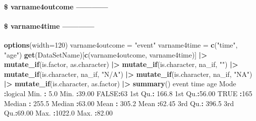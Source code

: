 \documentclass[
]{article}
\newenvironment{Shaded}{\begin{snugshade}}{\end{snugshade}}
\newcommand{\AttributeTok}[1]{\textcolor[rgb]{0.13,0.29,0.53}{#1}}
\newcommand{\ConstantTok}[1]{\textcolor[rgb]{0.56,0.35,0.01}{#1}}
\newcommand{\DecValTok}[1]{\textcolor[rgb]{0.00,0.00,0.81}{#1}}
\newcommand{\FloatTok}[1]{\textcolor[rgb]{0.00,0.00,0.81}{#1}}
\newcommand{\FunctionTok}[1]{\textcolor[rgb]{0.13,0.29,0.53}{\textbf{#1}}}
\newcommand{\NormalTok}[1]{#1}
\newcommand{\OtherTok}[1]{\textcolor[rgb]{0.56,0.35,0.01}{#1}}
\newcommand{\SpecialCharTok}[1]{\textcolor[rgb]{0.81,0.36,0.00}{\textbf{#1}}}
\newcommand{\StringTok}[1]{\textcolor[rgb]{0.31,0.60,0.02}{#1}}
\begin{document}
\hypertarget{varname4outcome}{%
\paragraph{\$ varname4outcome ------------}\label{varname4outcome}}

\hypertarget{varname4time}{%
\paragraph{\$ varname4time ------------}\label{varname4time}}

\begin{Shaded}
\begin{Highlighting}[]
\FunctionTok{options}\NormalTok{(}\AttributeTok{width=}\DecValTok{120}\NormalTok{)}
\NormalTok{varname4outcome }\OtherTok{=} \StringTok{"event"}
\NormalTok{varname4time }\OtherTok{=} \FunctionTok{c}\NormalTok{(}\StringTok{"time"}\NormalTok{, }\StringTok{"age"}\NormalTok{)}
\FunctionTok{get}\NormalTok{(DataSetName)[}\FunctionTok{c}\NormalTok{(varname4outcome, varname4time)] }\SpecialCharTok{|\textgreater{}} 
    \FunctionTok{mutate\_if}\NormalTok{(is.factor, as.character) }\SpecialCharTok{|\textgreater{}}  
    \FunctionTok{mutate\_if}\NormalTok{(is.character, na\_if, }\StringTok{""}\NormalTok{) }\SpecialCharTok{|\textgreater{}} \FunctionTok{mutate\_if}\NormalTok{(is.character, na\_if, }\StringTok{"N/A"}\NormalTok{) }\SpecialCharTok{|\textgreater{}} \FunctionTok{mutate\_if}\NormalTok{(is.character, na\_if, }\StringTok{"NA"}\NormalTok{) }\SpecialCharTok{|\textgreater{}} 
    \FunctionTok{mutate\_if}\NormalTok{(is.character, as.factor) }\SpecialCharTok{|\textgreater{}} 
    \FunctionTok{summary}\NormalTok{()}
\NormalTok{   event              time             age       }
\NormalTok{ Mode }\SpecialCharTok{:}\NormalTok{logical   Min.   }\SpecialCharTok{:}   \FloatTok{5.0}\NormalTok{   Min.   }\SpecialCharTok{:}\FloatTok{39.00}  
 \ConstantTok{FALSE}\SpecialCharTok{:}\DecValTok{63}\NormalTok{        1st Qu.}\SpecialCharTok{:} \FloatTok{166.8}\NormalTok{   1st Qu.}\SpecialCharTok{:}\FloatTok{56.00}  
 \ConstantTok{TRUE} \SpecialCharTok{:}\DecValTok{165}\NormalTok{       Median }\SpecialCharTok{:} \FloatTok{255.5}\NormalTok{   Median }\SpecialCharTok{:}\FloatTok{63.00}  
\NormalTok{                 Mean   }\SpecialCharTok{:} \FloatTok{305.2}\NormalTok{   Mean   }\SpecialCharTok{:}\FloatTok{62.45}  
\NormalTok{                 3rd Qu.}\SpecialCharTok{:} \FloatTok{396.5}\NormalTok{   3rd Qu.}\SpecialCharTok{:}\FloatTok{69.00}  
\NormalTok{                 Max.   }\SpecialCharTok{:}\FloatTok{1022.0}\NormalTok{   Max.   }\SpecialCharTok{:}\FloatTok{82.00}  
\end{Highlighting}
\end{Shaded}
\end{document}
